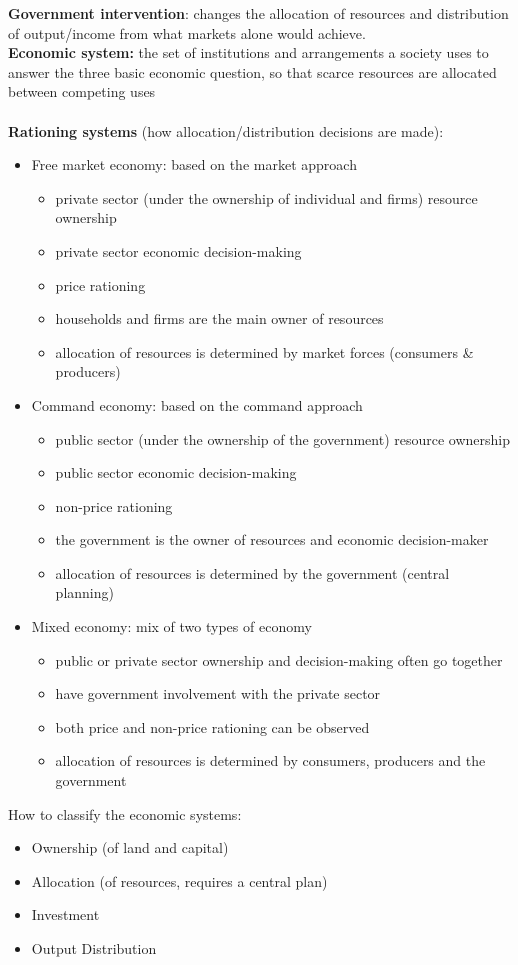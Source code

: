 \documentclass[a4paper,12pt]{article}
\begin{document}
\textbf{Government intervention}: changes the allocation of resources and distribution of output/income from what markets alone would achieve.\\
\textbf{Economic system:} the set of institutions and arrangements a society uses to answer the three basic economic question, so that scarce resources are allocated between competing uses\\\\
\textbf{Rationing systems} (how allocation/distribution decisions are made):
\begin{itemize}
  \item Free market economy: based on the market approach
  \begin{itemize}
    \item private sector (under the ownership of individual and firms) resource ownership
    \item private sector economic decision-making
    \item price rationing
    \item households and firms are the main owner of resources
    \item allocation of resources is determined by market forces (consumers \& producers)
  \end{itemize}
  \item Command economy: based on the command approach
  \begin{itemize}
    \item public sector (under the ownership of the government) resource ownership
    \item public sector economic decision-making
    \item non-price rationing
    \item the government is the owner of resources and economic decision-maker
    \item allocation of resources is determined by the government (central planning)
  \end{itemize}
  \item Mixed economy: mix of two types of economy
  \begin{itemize}
    \item public or private sector ownership and decision-making often go together
    \item have government involvement with the private sector
    \item both price and non-price rationing can be observed
    \item allocation of resources is determined by consumers, producers and the government
  \end{itemize}
\end{itemize}
How to classify the economic systems:
\begin{itemize}
\item Ownership (of land and capital)
\item Allocation (of resources, requires a central plan)
\item Investment
\item Output Distribution
\end{itemize}
\end{document}
